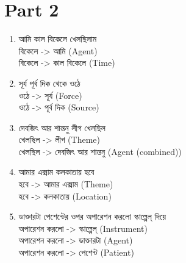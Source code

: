 \documentclass[11pt,a4paper,twocolumn]{article}
\begin{document}
	\section{Part 2}
	{\bg
	\begin{enumerate}
		
		\item আমি কাল বিকেলে খেলছিলাম\\
		\textcolor{hlit}{বিকেলে} -> \textcolor{rlit}{আমি} (Agent)\\
		\textcolor{hlit}{বিকেলে} -> \textcolor{rlit}{কাল বিকেলে} (Time)\\
				
		
		\item সূর্য পূর্ব দিক থেকে ওঠে \\
		\textcolor{hlit}{ওঠে} -> \textcolor{rlit}{সূর্য} (Force)\\
		\textcolor{hlit}{ওঠে} -> \textcolor{rlit}{পূর্ব দিক} (Source)\\
				
		\item দেবজিৎ আর শান্তনু লীগ খেলছিল \\
		\textcolor{hlit}{খেলছিল} -> \textcolor{rlit}{লীগ} (Theme)\\
		\textcolor{hlit}{খেলছিল} -> \textcolor{rlit}{দেবজিৎ আর শান্তনু} (Agent (combined))\\
				
		\item আমার এক্সাম কলকাতায় হবে \\
		\textcolor{hlit}{হবে} -> \textcolor{rlit}{আমার এক্সাম} (Theme)\\
		\textcolor{hlit}{হবে } -> \textcolor{rlit}{কলকাতায়} (Location)\\
				
		\item ডাক্তারটা পেশেন্টের ওপর অপারেশন করলো স্কাল্পেল্ দিয়ে \\
		\textcolor{hlit}{অপারেশন করলো} -> \textcolor{rlit}{স্কাল্পেল্} (Instrument)\\
		\textcolor{hlit}{অপারেশন করলো} -> \textcolor{rlit}{ডাক্তারটা} (Agent)\\
		\textcolor{hlit}{অপারেশন করলো} -> \textcolor{rlit}{পেশেন্ট} (Patient)\\
				
	\end{enumerate}		
	}	
	
\end{document}
